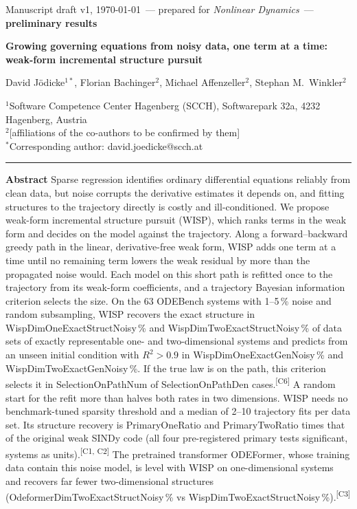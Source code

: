 \documentclass[10pt]{article}
\newif\ifpreliminary \preliminarytrue
\newcommand{\pv}[1]{\textcolor{prelim}{#1}}
\newcommand{\claimtag}[1]{\textsuperscript{\textcolor{prelim}{\sffamily\tiny[#1]}}}
\newcommand{\pv}[1]{#1}
\newcommand{\claimtag}[1]{}
\newcommand{\todo}[1]{\textcolor{prelim}{\sffamily\footnotesize[#1]}}
\newcommand{\m}[1]{\pv{\csname #1\endcsname}}            %
\begin{document}
\thispagestyle{plain}

\begin{flushleft}
{\small\color{ink2} Manuscript draft v1, \today\ --- prepared for \emph{Nonlinear Dynamics}\ifpreliminary\ --- \textcolor{prelim}{\textbf{preliminary results}}\fi}\\[5mm]
{\LARGE\bfseries Growing governing equations from noisy data, one term at a time: weak-form incremental structure pursuit\par}
\vspace{5mm}
{\large David Jödicke$^{1*}$, Florian Bachinger$^{2}$, Michael Affenzeller$^{2}$, Stephan M.\ Winkler$^{2}$\par}
\vspace{3mm}
{\small $^1$Software Competence Center Hagenberg (SCCH), Softwarepark 32a, 4232 Hagenberg, Austria\\
$^2$\todo{affiliations of the co-authors to be confirmed by them}\\[1mm]
$^*$Corresponding author: david.joedicke@scch.at\par}
\end{flushleft}
\vspace{2mm}
{\color{rule}\hrule}
\vspace{3mm}
\noindent\textbf{Abstract}\enspace
Sparse regression identifies ordinary differential equations reliably from clean data, but noise corrupts the
derivative estimates it depends on, and fitting structures to the trajectory directly is costly and ill-conditioned. We
propose weak-form incremental structure pursuit (WISP), which ranks terms in the weak form and decides on the model
against the trajectory. Along a forward--backward greedy path in the linear, derivative-free weak form, WISP adds one
term at a time until no remaining term lowers the weak residual by more than the propagated noise would. Each model on
this short path is refitted once to the trajectory from its weak-form coefficients, and a trajectory Bayesian
information criterion selects the size. On the 63 ODEBench systems with 1--5\,\% noise and random subsampling, WISP
recovers the exact structure in \m{WispDimOneExactStructNoisy}\,\% and \m{WispDimTwoExactStructNoisy}\,\% of data sets
of exactly representable one- and two-dimensional systems and predicts from an unseen initial condition with
$R^2>0.9$ in \m{WispDimOneExactGenNoisy}\,\% and \m{WispDimTwoExactGenNoisy}\,\%. If the true law is on the path, this
criterion selects it in \m{SelectionOnPathNum} of \m{SelectionOnPathDen} cases.\claimtag{C6} A random start for the
refit more than halves both rates in two dimensions. WISP needs no benchmark-tuned sparsity threshold and a median of
\pv{2--10} trajectory fits per data set. Its structure recovery is \m{PrimaryOneRatio} and \m{PrimaryTwoRatio} times
that of the original weak SINDy code (all four pre-registered primary tests significant, systems as
units).\claimtag{C1, C2} The pretrained transformer ODEFormer, whose training data contain this noise model, is level
with WISP on one-dimensional systems and recovers far fewer two-dimensional structures
(\m{OdeformerDimTwoExactStructNoisy}\,\% vs \m{WispDimTwoExactStructNoisy}\,\%).\claimtag{C3}
\end{document}
